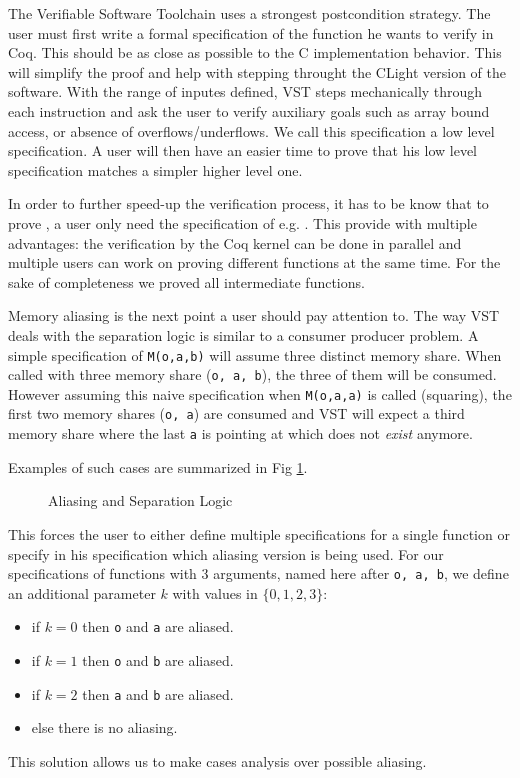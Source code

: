 The Verifiable Software Toolchain uses a strongest postcondition strategy.
The user must first write a formal specification of the function he wants to verify in Coq.
This should be as close as possible to the C implementation behavior.
This will simplify the proof and help with stepping throught the CLight version of the software.
With the range of inputes defined, VST steps mechanically through each instruction
and ask the user to verify auxiliary goals such as array bound access, or absence of overflows/underflows.
We call this specification a low level specification. A user will then have an easier
time to prove that his low level specification matches a simpler higher level one.

In order to further speed-up the verification process, it has to be know that to
prove , a user only need the specification of e.g. .
This provide with multiple advantages: the verification by the Coq kernel can be done
in parallel and multiple users can work on proving different functions at the same time.
For the sake of completeness we proved all intermediate functions.

Memory aliasing is the next point a user should pay attention to. The way VST
deals with the separation logic is similar to a consumer producer problem.
A simple specification of \texttt{M(o,a,b)} will assume three distinct memory share.
When called with three memory share (\texttt{o, a, b}), the three of them will be consumed.
However assuming this naive specification when \texttt{M(o,a,a)} is called (squaring),
the first two memory shares (\texttt{o, a}) are consumed and VST will expect a third
memory share where the last \texttt{a} is pointing at which does not \textit{exist} anymore.

Examples of such cases are summarized in Fig \ref{tk:MemSame}.
\begin{figure}[h]
  
  \caption{Aliasing and Separation Logic}
  \label{tk:MemSame}
\end{figure}

This forces the user to either define multiple specifications for a single function
or specify in his specification which aliasing version is being used.
For our specifications of functions with 3 arguments, named here after \texttt{o, a, b},
we define an additional parameter $k$ with values in
$\{0,1,2,3\}$:
\begin{itemize}
  \item if $k=0$ then \texttt{o} and \texttt{a} are aliased.
  \item if $k=1$ then \texttt{o} and \texttt{b} are aliased.
  \item if $k=2$ then \texttt{a} and \texttt{b} are aliased.
  \item else there is no aliasing.
\end{itemize}
This solution allows us to make cases analysis over possible aliasing.


